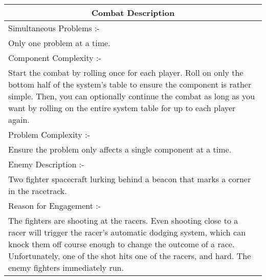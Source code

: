 \documentclass[a4paper]{article}
\begin{document}
\begin{minipage}[t]{0.5\linewidth}
\begin{tabular}[t]{| p{7cm} |}
\toprule
\multicolumn{1}{|c|}{Combat Description} \\
\midrule
Simultaneous Problems :- \\
Only one problem at a time. \\	
\midrule
Component Complexity :- \\
Start the combat by rolling once for each player. Roll on only the bottom half of the system's table to ensure the component is rather simple. Then, you can optionally continue the combat as long as you want by rolling on the entire system table for up to each player again. \\
\midrule
Problem Complexity :- \\
Ensure the problem only affects a single component at a time. \\
\midrule
Enemy Description :- \\
Two fighter spacecraft lurking behind a beacon that marks a corner in the racetrack. \\
\midrule
Reason for Engagement :- \\
The fighters are shooting at the racers. Even shooting close to a racer will trigger the racer's automatic dodging system, which can knock them off course enough to change the outcome of a race. Unfortunately, one of the shot hits one of the racers, and hard. The enemy fighters immediately run. \\
\bottomrule
\end{tabular}
\end{minipage}
\end{document}
